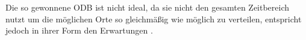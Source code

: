 Die so gewonnene ODB ist nicht ideal, da sie nicht den gesamten Zeitbereich nutzt um die möglichen Orte so gleichmäßig wie möglich zu verteilen, entspricht jedoch in ihrer Form den Erwartungen \cite[38]{hammanndiplom}.

